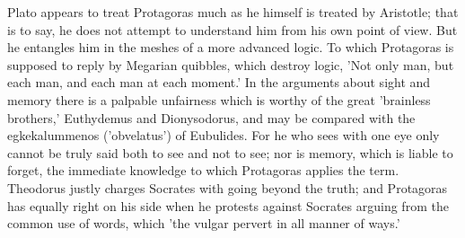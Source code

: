 \documentclass[11pt,letter]{article}
\begin{document}
\par  Plato appears to treat Protagoras much as he himself is treated by Aristotle; that is to say, he does not attempt to understand him from his own point of view. But he entangles him in the meshes of a more advanced logic. To which Protagoras is supposed to reply by Megarian quibbles, which destroy logic, 'Not only man, but each man, and each man at each moment.' In the arguments about sight and memory there is a palpable unfairness which is worthy of the great 'brainless brothers,' Euthydemus and Dionysodorus, and may be compared with the egkekalummenos ('obvelatus') of Eubulides. For he who sees with one eye only cannot be truly said both to see and not to see; nor is memory, which is liable to forget, the immediate knowledge to which Protagoras applies the term. Theodorus justly charges Socrates with going beyond the truth; and Protagoras has equally right on his side when he protests against Socrates arguing from the common use of words, which 'the vulgar pervert in all manner of ways.'
\end{document}
